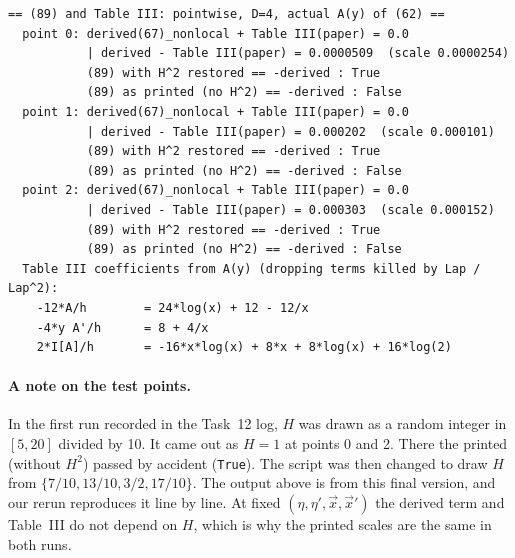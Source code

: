 {\footnotesize
\begin{verbatim}
== (89) and Table III: pointwise, D=4, actual A(y) of (62) ==
  point 0: derived(67)_nonlocal + Table III(paper) = 0.0
           | derived - Table III(paper) = 0.0000509  (scale 0.0000254)
           (89) with H^2 restored == -derived : True
           (89) as printed (no H^2) == -derived : False
  point 1: derived(67)_nonlocal + Table III(paper) = 0.0
           | derived - Table III(paper) = 0.000202  (scale 0.000101)
           (89) with H^2 restored == -derived : True
           (89) as printed (no H^2) == -derived : False
  point 2: derived(67)_nonlocal + Table III(paper) = 0.0
           | derived - Table III(paper) = 0.000303  (scale 0.000152)
           (89) with H^2 restored == -derived : True
           (89) as printed (no H^2) == -derived : False
  Table III coefficients from A(y) (dropping terms killed by Lap / Lap^2):
    -12*A/h        = 24*log(x) + 12 - 12/x
    -4*y A'/h      = 8 + 4/x
    2*I[A]/h       = -16*x*log(x) + 8*x + 8*log(x) + 16*log(2)
\end{verbatim}
}
\paragraph{A note on the test points.}
In the first run recorded in the Task~12 log, $H$ was drawn as a random integer in $[5,20]$ divided by 10. It came out as $H=1$ at points 0 and 2.
There the printed  (without $H^2$) passed by accident (\texttt{True}).
The script was then changed to draw $H$ from $\{7/10,13/10,3/2,17/10\}$. The output above is from this final version, and our rerun reproduces it line by line.
At fixed $(\eta,\eta',\vec x,\vec x')$ the derived term and Table~III do not depend on $H$, which is why the printed scales are the same in both runs.

